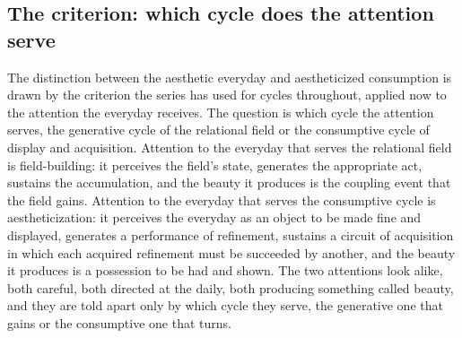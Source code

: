 \subsection{The criterion: which cycle does the attention serve}
\label{p22:sub:fetish-criterion}

The distinction between the aesthetic everyday and aestheticized consumption is drawn by the criterion the series has used for cycles throughout, applied now to the attention the everyday receives. The question is which cycle the attention serves, the generative cycle of the relational field or the consumptive cycle of display and acquisition. Attention to the everyday that serves the relational field is field-building: it perceives the field's state, generates the appropriate act, sustains the accumulation, and the beauty it produces is the coupling event that the field gains. Attention to the everyday that serves the consumptive cycle is aestheticization: it perceives the everyday as an object to be made fine and displayed, generates a performance of refinement, sustains a circuit of acquisition in which each acquired refinement must be succeeded by another, and the beauty it produces is a possession to be had and shown. The two attentions look alike, both careful, both directed at the daily, both producing something called beauty, and they are told apart only by which cycle they serve, the generative one that gains or the consumptive one that turns.


